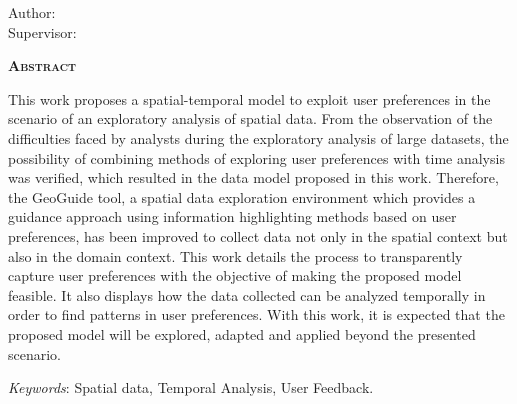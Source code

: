 \begin{center}
	{\Large{\textbf{\myThesisEnglish}}}
\end{center}

\vspace{1cm}

\begin{flushright}
	Author: \myName\\
	Supervisor: \mySupervisorName
\end{flushright}

\vspace{1cm}

\begin{center}
	\Large{\textsc{\textbf{Abstract}}}
\end{center}

\noindent This work proposes a spatial-temporal model to exploit user preferences in the scenario of an exploratory analysis of spatial data. From the observation of the difficulties faced by analysts during the exploratory analysis of large datasets, the possibility of combining methods of exploring user preferences with time analysis was verified, which resulted in the data model proposed in this work. Therefore, the GeoGuide tool, a spatial data exploration environment which provides a guidance approach using information highlighting methods based on user preferences, has been improved to collect data not only in the spatial context but also in the domain context. This work details the process to transparently capture user preferences with the objective of making the proposed model feasible. It also displays how the data collected can be analyzed temporally in order to find patterns in user preferences. With this work, it is expected that the proposed model will be explored, adapted and applied beyond the presented scenario.

\noindent\textit{Keywords}: Spatial data, Temporal Analysis, User Feedback.